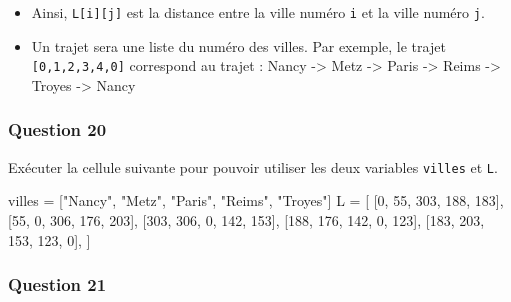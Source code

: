 \documentclass[
  paper=a4,
  ,captions=tableheading
]{scrartcl}
\newenvironment{Shaded}{}{}
\newcommand{\DecValTok}[1]{\textcolor[rgb]{0.25,0.63,0.44}{#1}}
\newcommand{\NormalTok}[1]{#1}
\newcommand{\OperatorTok}[1]{\textcolor[rgb]{0.40,0.40,0.40}{#1}}
\newcommand{\StringTok}[1]{\textcolor[rgb]{0.25,0.44,0.63}{#1}}
\providecommand{\tightlist}{%
  \setlength{\itemsep}{0pt}\setlength{\parskip}{0pt}}
\begin{document}
\begin{itemize}
\tightlist
\item
  Ainsi, \texttt{L{[}i{]}{[}j{]}} est la distance entre la ville numéro
  \texttt{i} et la ville numéro \texttt{j}.
\item
  Un trajet sera une liste du numéro des villes. Par exemple, le trajet
  \texttt{{[}0,1,2,3,4,0{]}} correspond au trajet : Nancy
  -\textgreater{} Metz -\textgreater{} Paris -\textgreater{} Reims
  -\textgreater{} Troyes -\textgreater{} Nancy
\end{itemize}

\hypertarget{question-20}{%
\subsubsection{Question 20}\label{question-20}}

Exécuter la cellule suivante pour pouvoir utiliser les deux variables
\texttt{villes} et \texttt{L}.

\begin{Shaded}
\begin{Highlighting}[]
\NormalTok{villes }\OperatorTok{=}\NormalTok{ [}\StringTok{"Nancy"}\NormalTok{, }\StringTok{"Metz"}\NormalTok{, }\StringTok{"Paris"}\NormalTok{, }\StringTok{"Reims"}\NormalTok{, }\StringTok{"Troyes"}\NormalTok{]}
\NormalTok{L }\OperatorTok{=}\NormalTok{ [}
\NormalTok{    [}\DecValTok{0}\NormalTok{, }\DecValTok{55}\NormalTok{, }\DecValTok{303}\NormalTok{, }\DecValTok{188}\NormalTok{, }\DecValTok{183}\NormalTok{],}
\NormalTok{    [}\DecValTok{55}\NormalTok{, }\DecValTok{0}\NormalTok{, }\DecValTok{306}\NormalTok{, }\DecValTok{176}\NormalTok{, }\DecValTok{203}\NormalTok{],}
\NormalTok{    [}\DecValTok{303}\NormalTok{, }\DecValTok{306}\NormalTok{, }\DecValTok{0}\NormalTok{, }\DecValTok{142}\NormalTok{, }\DecValTok{153}\NormalTok{],}
\NormalTok{    [}\DecValTok{188}\NormalTok{, }\DecValTok{176}\NormalTok{, }\DecValTok{142}\NormalTok{, }\DecValTok{0}\NormalTok{, }\DecValTok{123}\NormalTok{],}
\NormalTok{    [}\DecValTok{183}\NormalTok{, }\DecValTok{203}\NormalTok{, }\DecValTok{153}\NormalTok{, }\DecValTok{123}\NormalTok{, }\DecValTok{0}\NormalTok{],}
\NormalTok{]}
\end{Highlighting}
\end{Shaded}

\hypertarget{question-21}{%
\subsubsection{Question 21}\label{question-21}}
\end{document}
